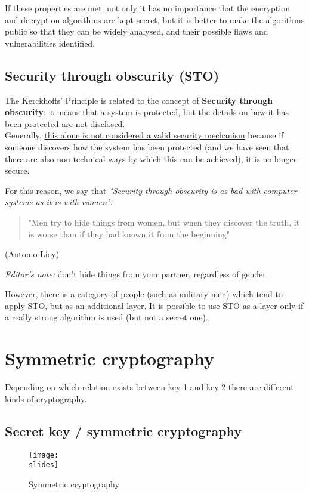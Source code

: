 If these properties are met,
not only it has no importance that the encryption and decryption algorithms are kept secret, but it is better to
make the algorithms public so that they can be widely analysed, and their possible flaws and vulnerabilities identified.

\subsection*{Security through obscurity (STO)}
The Kerckhoffs' Principle is related to the concept of \textbf{Security through obscurity}: it means that a system is protected, but the details on how it has been protected are not disclosed.\\
Generally, \ul{this alone is not considered a valid security mechanism} because if someone discovers how the system has been protected (and we have seen that there are also non-technical ways by which this can be achieved), it is no longer secure.

For this reason, we say that \emph{"Security through obscurity is as bad with computer systems as it is with women"}.
\begin{quote}
    "Men try to hide things from women, but when they discover the truth, it is worse than if they had known it from the beginning"
\end{quote}
\begin{flushright}
    (Antonio Lioy)
\end{flushright}
\emph{Editor's note:} don't hide things from your partner, regardless of gender.


However, there is a category of people (such as military men) which tend to apply STO, but as an \ul{additional
    layer}. It is possible to use STO as a layer only if a really strong algorithm is used (but not a secret one).



\section{Symmetric cryptography}
Depending on which relation exists between key-1 and key-2 there are different kinds of cryptography.

\subsection*{Secret key / symmetric cryptography}
\begin{figure}[h]
    \centering
    \texttt{[image: \\slides]}
    \caption{Symmetric cryptography}
    \label{fig:cap2slide6}
\end{figure}

